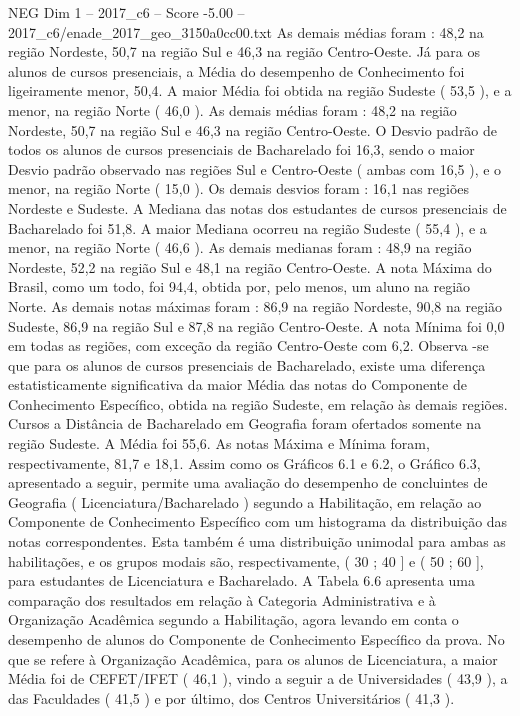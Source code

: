 \begin{textsample}{NEG Dim 1 – 2017\_c6 – Score -5.00 – 2017\_c6/enade\_2017\_geo\_3150a0cc00.txt}
As demais médias foram : 48,2 na região Nordeste, 50,7 na região Sul e 46,3 na região Centro-Oeste.
Já para os alunos de cursos presenciais, a Média do desempenho de Conhecimento foi ligeiramente menor, 50,4.
A maior Média foi obtida na região Sudeste ( 53,5 ), e a menor, na região Norte ( 46,0 ).
As demais médias foram : 48,2 na região Nordeste, 50,7 na região Sul e 46,3 na região Centro-Oeste.
O Desvio padrão de todos os alunos de cursos presenciais de Bacharelado foi 16,3, sendo o maior Desvio padrão observado nas regiões Sul e Centro-Oeste ( ambas com 16,5 ), e o menor, na região Norte ( 15,0 ).
Os demais desvios foram : 16,1 nas regiões Nordeste e Sudeste.
A Mediana das notas dos estudantes de cursos presenciais de Bacharelado foi 51,8.
A maior Mediana ocorreu na região Sudeste ( 55,4 ), e a menor, na região Norte ( 46,6 ).
As demais medianas foram : 48,9 na região Nordeste, 52,2 na região Sul e 48,1 na região Centro-Oeste.
A nota Máxima do Brasil, como um todo, foi 94,4, obtida por, pelo menos, um aluno na região Norte.
As demais notas máximas foram : 86,9 na região Nordeste, 90,8 na região Sudeste, 86,9 na região Sul e 87,8 na região Centro-Oeste.
A nota Mínima foi 0,0 em todas as regiões, com exceção da região Centro-Oeste com 6,2.
Observa -se que para os alunos de cursos presenciais de Bacharelado, existe uma diferença estatisticamente significativa da maior Média das notas do Componente de Conhecimento Específico, obtida na região Sudeste, em relação às demais regiões.
Cursos a Distância de Bacharelado em Geografia foram ofertados somente na região Sudeste.
A Média foi 55,6.
As notas Máxima e Mínima foram, respectivamente, 81,7 e 18,1.
Assim como os Gráficos 6.1 e 6.2, o Gráfico 6.3, apresentado a seguir, permite uma avaliação do desempenho de concluintes de Geografia ( Licenciatura/Bacharelado ) segundo a Habilitação, em relação ao Componente de Conhecimento Específico com um histograma da distribuição das notas correspondentes.
Esta também é uma distribuição unimodal para ambas as habilitações, e os grupos modais são, respectivamente, ( 30 ; 40 ] e ( 50 ; 60 ], para estudantes de Licenciatura e Bacharelado.
A Tabela 6.6 apresenta uma comparação dos resultados em relação à Categoria Administrativa e à Organização Acadêmica segundo a Habilitação, agora levando em conta o desempenho de alunos do Componente de Conhecimento Específico da prova.
No que se refere à Organização Acadêmica, para os alunos de Licenciatura, a maior Média foi de CEFET/IFET ( 46,1 ), vindo a seguir a de Universidades ( 43,9 ), a das Faculdades ( 41,5 ) e por último, dos Centros Universitários ( 41,3 ).

\end{textsample}
